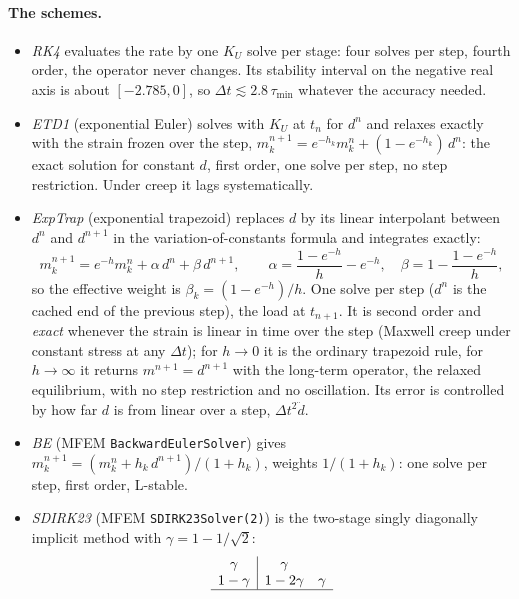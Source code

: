 \documentclass[11pt]{article}
\numberwithin{equation}{section}
\newcommand{\code}[1]{\texttt{#1}}
\begin{document}
\paragraph{The schemes.}
\begin{itemize}[leftmargin=*]
\item \emph{RK4} evaluates the rate by one $K_U$ solve per stage: four
  solves per step, fourth order, the operator never changes. Its stability
  interval on the negative real axis is about $[-2.785,0]$, so
  $\Delta t\lesssim2.8\,\tau_{\min}$ whatever the accuracy needed.
\item \emph{ETD1} (exponential Euler) solves with $K_U$ at $t_n$ for $d^n$
  and relaxes exactly with the strain frozen over the step,
  $m_k^{n+1} = e^{-h_k}m_k^{n} + (1-e^{-h_k})\,d^{n}$: the exact solution
  for constant $d$, first order, one solve per step, no step restriction.
  Under creep it lags systematically.
\item \emph{ExpTrap} (exponential trapezoid) replaces $d$ by its linear
  interpolant between $d^n$ and $d^{n+1}$ in the variation-of-constants
  formula and integrates exactly:
  \begin{equation}
    m_k^{n+1} = e^{-h}m_k^{n} + \alpha\,d^{n} + \beta\,d^{n+1},\qquad
    \alpha = \frac{1-e^{-h}}{h}-e^{-h},\quad
    \beta = 1-\frac{1-e^{-h}}{h},
  \end{equation}
  so the effective weight is $\beta_k=(1-e^{-h})/h$. One solve per step
  ($d^n$ is the cached end of the previous step), the load at $t_{n+1}$.
  It is second order and \emph{exact} whenever the strain is linear in time
  over the step (Maxwell creep under constant stress at any $\Delta t$); for
  $h\to0$ it is the ordinary trapezoid rule, for $h\to\infty$ it returns
  $m^{n+1}=d^{n+1}$ with the long-term operator, the relaxed equilibrium,
  with no step restriction and no oscillation. Its error is controlled by
  how far $d$ is from linear over a step, $\Delta t^2\ddot d$.
\item \emph{BE} (MFEM \code{BackwardEulerSolver}) gives
  $m_k^{n+1} = (m_k^{n} + h_k\,d^{n+1})/(1+h_k)$, weights $1/(1+h_k)$: one
  solve per step, first order, L-stable.
\item \emph{SDIRK23} (MFEM \code{SDIRK23Solver(2)}) is the two-stage
  singly diagonally implicit method with $\gamma=1-1/\sqrt2$:
  \begin{equation}
  \begin{array}{c|cc}
    \gamma & \gamma & \\
    1-\gamma & 1-2\gamma & \gamma\\ \hline

\end{array}
\end{equation}
\end{itemize}
\end{document}
